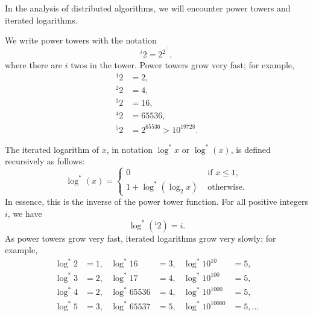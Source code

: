 
In the analysis of distributed algorithms, we will encounter power towers and iterated logarithms.



We write power towers with the notation
\[
    {}^i 2 = 2^{2^{\cdot^{\cdot^2}}},
\]
where there are $i$ twos in the tower. Power towers grow very fast; for example,
\begin{align*}
    {}^1 2 &= 2,\\
    {}^2 2 &= 4,\\
    {}^3 2 &= 16,\\
    {}^4 2 &= 65536,\\
    {}^5 2 &= 2^{65536} > 10^{19728}.
\end{align*}



The iterated logarithm of $x$, in notation $\log^* x$ or $\log^*(x)$, is defined recursively as follows:
\[
    \log^*(x) = \begin{cases}
        0 & \text{ if $x \le 1$}, \\
        1 + \log^*(\log_2 x) & \text{ otherwise}.
    \end{cases}
\]
In essence, this is the inverse of the power tower function. For all positive integers $i$, we have
\[
    \log^*({}^i 2) = i.
\]
As power towers grow very fast, iterated logarithms grow very slowly; for example,
\begin{align*}
    \log^* 2 &= 1, &
    \log^* 16 &= 3, &
    \log^* 10^{10} &= 5, \\
    \log^* 3 &= 2, &
    \log^* 17 &= 4, &
    \log^* 10^{100} &= 5, \\
    \log^* 4 &= 2, &
    \log^* 65536 &= 4, &
    \log^* 10^{1000} &= 5, \\
    \log^* 5 &= 3, &
    \log^* 65537 &= 5, &
    \log^* 10^{10000} &= 5, \dotsc
\end{align*}
